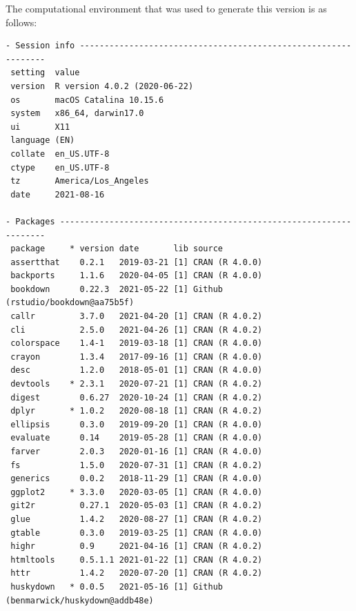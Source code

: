 \documentclass [11pt, proquest] {uwthesis}[2015/03/03]
\begin{document}
The computational environment that was used to generate this version is
as follows:
\begin{verbatim}
- Session info ---------------------------------------------------------------
 setting  value                       
 version  R version 4.0.2 (2020-06-22)
 os       macOS Catalina 10.15.6      
 system   x86_64, darwin17.0          
 ui       X11                         
 language (EN)                        
 collate  en_US.UTF-8                 
 ctype    en_US.UTF-8                 
 tz       America/Los_Angeles         
 date     2021-08-16                  

- Packages -------------------------------------------------------------------
 package     * version date       lib source                               
 assertthat    0.2.1   2019-03-21 [1] CRAN (R 4.0.0)                       
 backports     1.1.6   2020-04-05 [1] CRAN (R 4.0.0)                       
 bookdown      0.22.3  2021-05-22 [1] Github (rstudio/bookdown@aa75b5f)    
 callr         3.7.0   2021-04-20 [1] CRAN (R 4.0.2)                       
 cli           2.5.0   2021-04-26 [1] CRAN (R 4.0.2)                       
 colorspace    1.4-1   2019-03-18 [1] CRAN (R 4.0.0)                       
 crayon        1.3.4   2017-09-16 [1] CRAN (R 4.0.0)                       
 desc          1.2.0   2018-05-01 [1] CRAN (R 4.0.0)                       
 devtools    * 2.3.1   2020-07-21 [1] CRAN (R 4.0.2)                       
 digest        0.6.27  2020-10-24 [1] CRAN (R 4.0.2)                       
 dplyr       * 1.0.2   2020-08-18 [1] CRAN (R 4.0.2)                       
 ellipsis      0.3.0   2019-09-20 [1] CRAN (R 4.0.0)                       
 evaluate      0.14    2019-05-28 [1] CRAN (R 4.0.0)                       
 farver        2.0.3   2020-01-16 [1] CRAN (R 4.0.0)                       
 fs            1.5.0   2020-07-31 [1] CRAN (R 4.0.2)                       
 generics      0.0.2   2018-11-29 [1] CRAN (R 4.0.0)                       
 ggplot2     * 3.3.0   2020-03-05 [1] CRAN (R 4.0.0)                       
 git2r         0.27.1  2020-05-03 [1] CRAN (R 4.0.2)                       
 glue          1.4.2   2020-08-27 [1] CRAN (R 4.0.2)                       
 gtable        0.3.0   2019-03-25 [1] CRAN (R 4.0.0)                       
 highr         0.9     2021-04-16 [1] CRAN (R 4.0.2)                       
 htmltools     0.5.1.1 2021-01-22 [1] CRAN (R 4.0.2)                       
 httr          1.4.2   2020-07-20 [1] CRAN (R 4.0.2)                       
 huskydown   * 0.0.5   2021-05-16 [1] Github (benmarwick/huskydown@addb48e)

\end{verbatim}
\end{document}
